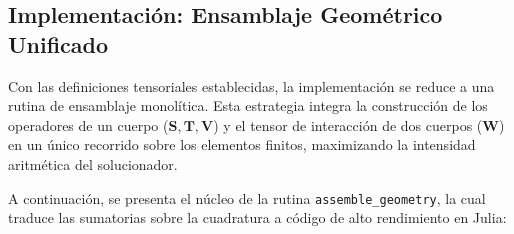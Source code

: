 \subsection{Implementación: Ensamblaje Geométrico Unificado}

Con las definiciones tensoriales establecidas, la implementación se reduce a una rutina de ensamblaje monolítica. Esta estrategia integra la construcción de los operadores de un cuerpo (\(\mathbf{S}, \mathbf{T}, \mathbf{V}\)) y el tensor de interacción de dos cuerpos (\(\mathbf{W}\)) en un único recorrido sobre los elementos finitos, maximizando la intensidad aritmética del solucionador.

A continuación, se presenta el núcleo de la rutina \texttt{assemble\_geometry}, la cual traduce las sumatorias sobre la cuadratura a código de alto rendimiento en Julia:

